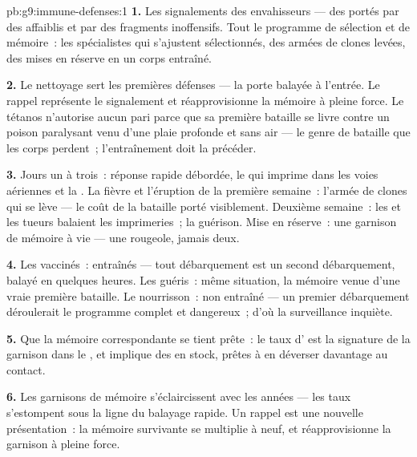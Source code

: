 \begin{solution}{pb:g9:immune-defenses:1}
\textbf{1.} Les signalements des envahisseurs --- des
 portés par des  affaiblis et par des
fragments inoffensifs. Tout le programme de sélection et de
mémoire~: les spécialistes qui s'ajustent sélectionnés, des
armées de clones levées, des  mises en
réserve en un corps entraîné.

\textbf{2.} Le nettoyage sert les premières défenses --- la
porte balayée à l'entrée. Le rappel représente le
signalement et réapprovisionne la mémoire à pleine force. Le
tétanos n'autorise aucun pari parce que sa première bataille
se livre contre un poison paralysant venu d'une plaie
profonde et sans air --- le genre de bataille que les corps
perdent~; l'entraînement doit la précéder.

\textbf{3.} Jours un à trois~: réponse rapide débordée, le
 qui imprime dans les voies aériennes et la . La
fièvre et l'éruption de la première semaine~: l'armée de
clones qui se lève --- le coût de la bataille porté
visiblement. Deuxième semaine~: les  et les tueurs
balaient les imprimeries~; la guérison. Mise en réserve~:
une garnison de mémoire à vie --- une rougeole, jamais deux.

\textbf{4.} Les vaccinés~: entraînés --- tout débarquement
est un second débarquement, balayé en quelques heures. Les
guéris~: même situation, la mémoire venue d'une vraie
première bataille. Le nourrisson~: non entraîné --- un
premier débarquement déroulerait le programme complet et
dangereux~; d'où la surveillance inquiète.

\textbf{5.} Que la mémoire correspondante se tient prête~:
le taux d' est la signature de la garnison dans le
, et implique des  en stock, prêtes à en
déverser davantage au contact.

\textbf{6.} Les garnisons de mémoire s'éclaircissent avec
les années --- les taux s'estompent sous la ligne du
balayage rapide. Un rappel est une nouvelle présentation~:
la mémoire survivante se multiplie à neuf, et
réapprovisionne la garnison à pleine force.


\end{solution}
